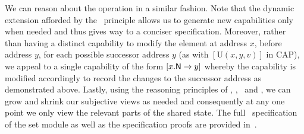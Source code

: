 We can reason about the  operation in a similar fashion. Note that the dynamic extension afforded by the \extendRule\ principle allows us to generate new capabilities only when needed and thus gives way to a conciser specification. 
%
Moreover, rather than having a distinct capability to modify the element at address $x$, before address $y$, for each possible successor address $y$ (as with $[\text{U}(x, y, v)]$ in CAP), we appeal to a single capability of the form $\nextC{x}{y}$ whereby the capability is modified accordingly to record the changes to the successor address as demonstrated above. 
%
Lastly, using the reasoning principles of \mergeRule, \forgetRule, \shiftRule\ and \copyRule, we can grow and shrink our subjective views as needed and consequently at any one point we only view the relevant parts of the shared state. 
%
The full \colosl\ specification of the set module as well as the specification proofs are provided in~\cite{colosl-tr14}.


